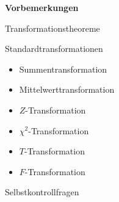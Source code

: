 \documentclass[
  8pt,
  ignorenonframetext,
]{beamer}
\providecommand{\tightlist}{%
  \setlength{\itemsep}{0pt}\setlength{\parskip}{0pt}}
\begin{document}
\begin{frame}{}
\protect\hypertarget{section-3}{}
\large

\textbf{Vorbemerkungen}

Transformationstheoreme

Standardtransformationen

\normalsize

\begin{itemize}
\tightlist
\item
  Summentransformation
\item
  Mittelwerttransformation
\item
  \(Z\)-Transformation
\item
  \(\chi^2\)-Transformation
\item
  \(T\)-Transformation
\item
  \(F\)-Transformation
\end{itemize}

\large

Selbstkontrollfragen
\end{frame}
\end{document}
